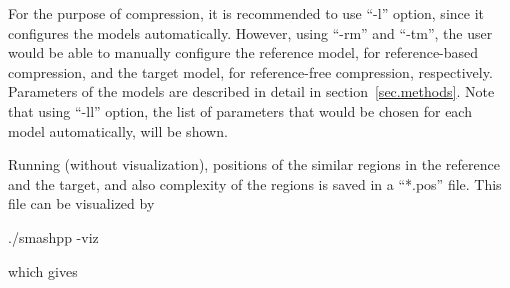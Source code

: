 For the purpose of compression, it is recommended to use ``-l'' option, since it configures the models automatically. However, using ``-rm'' and ``-tm'', the user would be able to manually configure the reference model, for reference-based compression, and the target model, for reference-free compression, respectively. Parameters of the models are described in detail in section~\ref{sec.methods}.
Note that using ``-ll'' option, the list of parameters that would be chosen for each model automatically, will be shown.

Running \smashpp (without visualization), positions of the similar regions in the reference and the target, and also complexity of the regions is saved in a ``*.pos'' file. This file can be visualized by
\begin{code}[style=bash]
  ./smashpp -viz
\end{code}
which gives



